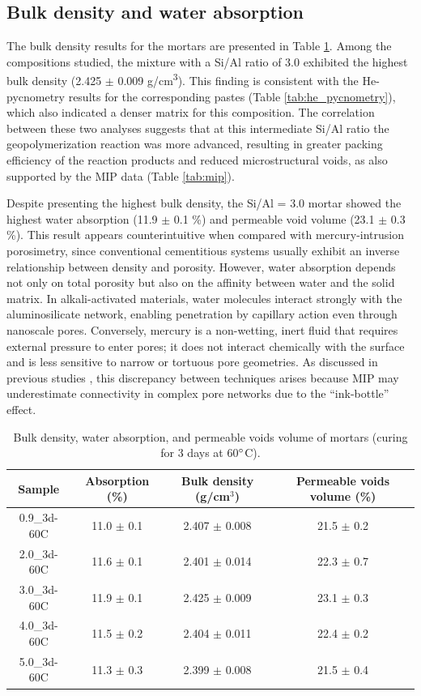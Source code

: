 \subsection{Bulk density and water absorption}

The bulk density results for the mortars are presented in Table \ref{tab:bulk_density_water_absorption}.
Among the compositions studied, the mixture with a Si/Al ratio of 3.0 exhibited the highest bulk density (2.425 $\pm$ 0.009 g/cm\textsuperscript{3}).
This finding is consistent with the He-pycnometry results for the corresponding pastes (Table \ref{tab:he_pycnometry}), which also indicated a denser matrix for this composition.
The correlation between these two analyses suggests that at this intermediate Si/Al ratio the geopolymerization reaction was more advanced, resulting in greater packing efficiency of the reaction products and reduced microstructural voids, as also supported by the MIP data (Table \ref{tab:mip}).

Despite presenting the highest bulk density, the Si/Al = 3.0 mortar showed the highest water absorption (11.9 $\pm$ 0.1 \%) and permeable void volume (23.1 $\pm$ 0.3 \%).
This result appears counterintuitive when compared with mercury-intrusion porosimetry, since conventional cementitious systems usually exhibit an inverse relationship between density and porosity.
However, water absorption depends not only on total porosity but also on the affinity between water and the solid matrix.
In alkali-activated materials, water molecules interact strongly with the aluminosilicate network, enabling penetration by capillary action even through nanoscale pores.
Conversely, mercury is a non-wetting, inert fluid that requires external pressure to enter pores; it does not interact chemically with the surface and is less sensitive to narrow or tortuous pore geometries.
As discussed in previous studies \cite{Provis2014_LowCa}, this discrepancy between techniques arises because MIP may underestimate connectivity in complex pore networks due to the “ink-bottle” effect.

\begin{table}[H]
  \centering
  \caption{Bulk density, water absorption, and permeable voids volume of mortars (curing for 3 days at 60$^{\circ}$C).}
  \label{tab:bulk_density_water_absorption}
  \begin{tabular}{cccc}
    \hline
    Sample & Absorption (\%) & Bulk density (g/cm$^3$) & Permeable voids volume (\%) \\
    \hline
    0.9\_3d-60C & 11.0 $\pm$ 0.1 & 2.407 $\pm$ 0.008 & 21.5 $\pm$ 0.2 \\
    2.0\_3d-60C & 11.6 $\pm$ 0.1 & 2.401 $\pm$ 0.014 & 22.3 $\pm$ 0.7 \\
    3.0\_3d-60C & 11.9 $\pm$ 0.1 & 2.425 $\pm$ 0.009 & 23.1 $\pm$ 0.3 \\
    4.0\_3d-60C & 11.5 $\pm$ 0.2 & 2.404 $\pm$ 0.011 & 22.4 $\pm$ 0.2 \\
    5.0\_3d-60C & 11.3 $\pm$ 0.3 & 2.399 $\pm$ 0.008 & 21.5 $\pm$ 0.4 \\
    \hline
  \end{tabular}
\end{table}

